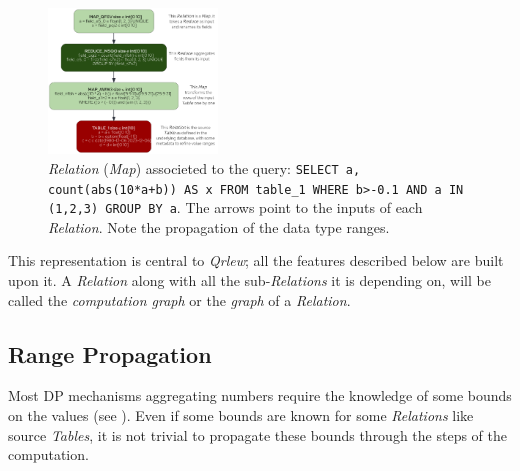 \documentclass[letterpaper]{article} %
\newcommand{\qrlew}{\emph{Qrlew}}
\begin{document}
\begin{figure}[t]
    \centering
    \includegraphics[width=0.4\textwidth]{figures/relation}
    \caption{\emph{Relation} (\emph{Map}) associeted to the query: \texttt{SELECT a, count(abs(10*a+b)) AS x FROM table\_1 WHERE b>-0.1 AND a IN (1,2,3) GROUP BY a}. The arrows point to the inputs of each \emph{Relation}. Note the propagation of the data type ranges.}
    \label{process}
\end{figure}

This representation is central to \qrlew{}; all the features described below are built upon it. A \emph{Relation} along with all the  sub-\emph{Relations} it is depending on, will be called the \emph{computation graph} or the \emph{graph} of a \emph{Relation}.

\subsection{Range Propagation}
\label{sec:range_propagation}

Most DP mechanisms aggregating numbers require the knowledge of some bounds on the values (see \cite{dwork2014algorithmic}).
Even if some bounds are known for some \emph{Relations} like source \emph{Tables}, it is not trivial to propagate these bounds through the steps of the computation.
\end{document}
